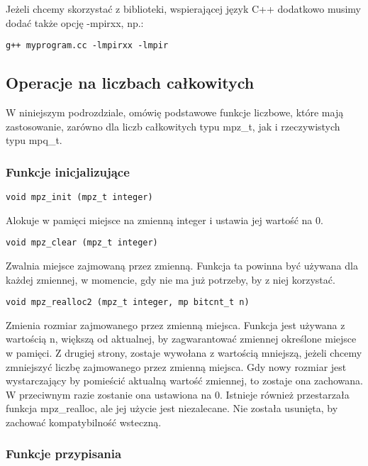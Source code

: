 \documentclass[twoside,a4paper]{book}
\begin{document}
Jeżeli chcemy skorzystać z biblioteki, wspierającej język C++ dodatkowo musimy dodać także opcję -mpirxx, np.:
\begin{lstlisting}
g++ myprogram.cc -lmpirxx -lmpir
\end{lstlisting}

\subsection{Operacje na liczbach całkowitych}
W niniejszym podrozdziale, omówię podstawowe funkcje liczbowe, które mają zastosowanie, zarówno dla liczb całkowitych typu mpz\_t, jak i rzeczywistych typu mpq\_t.

\subsubsection{Funkcje inicjalizujące}
\begin{lstlisting}
void mpz_init (mpz_t integer)
\end{lstlisting}

Alokuje w pamięci miejsce na zmienną integer i ustawia jej wartość na 0.

\begin{lstlisting}
void mpz_clear (mpz_t integer)
\end{lstlisting}

Zwalnia miejsce zajmowaną przez zmienną. Funkcja ta powinna być używana dla każdej zmiennej, w momencie, gdy nie ma już potrzeby, by z niej korzystać.

\begin{lstlisting}
void mpz_realloc2 (mpz_t integer, mp bitcnt_t n)
\end{lstlisting}

Zmienia rozmiar zajmowanego przez zmienną miejsca. Funkcja jest używana z wartością n, większą od aktualnej, by zagwarantować zmiennej określone miejsce w pamięci. Z drugiej strony, zostaje wywołana z wartością mniejszą, jeżeli chcemy zmniejszyć liczbę zajmowanego przez zmienną miejsca. Gdy nowy rozmiar jest wystarczający by pomieścić aktualną wartość zmiennej, to zostaje ona zachowana. W przeciwnym razie zostanie ona ustawiona na 0. Istnieje również przestarzała funkcja mpz\_realloc, ale jej użycie jest niezalecane. Nie została usunięta, by zachować kompatybilność wsteczną.

\subsubsection{Funkcje przypisania}
\end{document}
